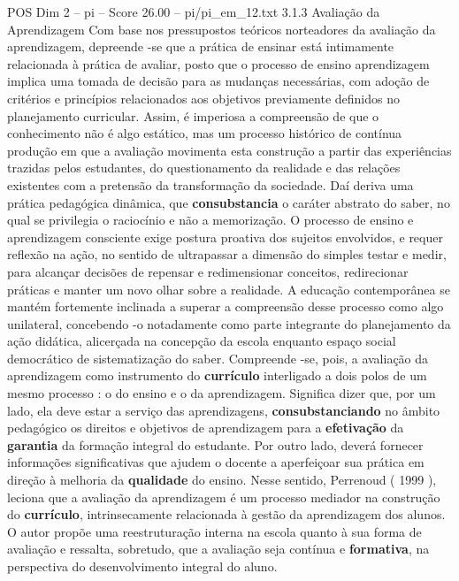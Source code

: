 \begin{textsample}{POS Dim 2 – pi – Score 26.00 – pi/pi\_em\_12.txt}  \label{ex:f2_pos_099}
3.1.3 Avaliação da Aprendizagem Com base nos pressupostos teóricos norteadores da avaliação da aprendizagem, depreende -se que a prática de ensinar está intimamente relacionada à prática de avaliar, posto que o processo de ensino aprendizagem implica uma tomada de decisão para as mudanças necessárias, com adoção de critérios e princípios relacionados aos objetivos previamente definidos no planejamento curricular.
Assim, é imperiosa a compreensão de que o conhecimento não é algo estático, mas um processo histórico de contínua produção em que a avaliação movimenta esta construção a partir das experiências trazidas pelos estudantes, do questionamento da realidade e das relações existentes com a pretensão da transformação da sociedade.
Daí deriva uma prática pedagógica dinâmica, que \textbf{consubstancia} o caráter abstrato do saber, no qual se privilegia o raciocínio e não a memorização.
O processo de ensino e aprendizagem consciente exige postura proativa dos sujeitos envolvidos, e requer reflexão na ação, no sentido de ultrapassar a dimensão do simples testar e medir, para alcançar decisões de repensar e redimensionar conceitos, redirecionar práticas e manter um novo olhar sobre a realidade.
A educação contemporânea se mantém fortemente inclinada a superar a compreensão desse processo como algo unilateral, concebendo -o notadamente como parte integrante do planejamento da ação didática, alicerçada na concepção da escola enquanto espaço social democrático de sistematização do saber.
Compreende -se, pois, a avaliação da aprendizagem como instrumento do \textbf{currículo} interligado a dois polos de um mesmo processo : o do ensino e o da aprendizagem.
Significa dizer que, por um lado, ela deve estar a serviço das aprendizagens, \textbf{consubstanciando} no âmbito pedagógico os direitos e objetivos de aprendizagem para a \textbf{efetivação} da \textbf{garantia} da formação integral do estudante.
Por outro lado, deverá fornecer informações significativas que ajudem o docente a aperfeiçoar sua prática em direção à melhoria da \textbf{qualidade} do ensino.
Nesse sentido, Perrenoud ( 1999 ), leciona que a avaliação da aprendizagem é um processo mediador na construção do \textbf{currículo}, intrinsecamente relacionada à gestão da aprendizagem dos alunos.
O autor propõe uma reestruturação interna na escola quanto à sua forma de avaliação e ressalta, sobretudo, que a avaliação seja contínua e \textbf{formativa}, na perspectiva do desenvolvimento integral do aluno.

\end{textsample}
